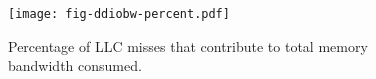 \begin{figure}[t]
\texttt{[image: fig-ddiobw-percent.pdf]}
\caption{Percentage of LLC misses that contribute to total memory bandwidth consumed.}
\label{fig:ddiobw-percent}
\end{figure}
